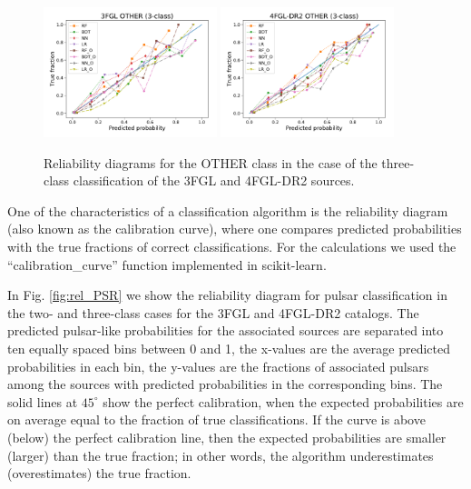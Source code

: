 \documentclass[referee]{aa} %
\begin{document}
\begin{appendix}
\begin{figure}[ht]
\centering
\includegraphics[width=0.45\textwidth]{plots/reliability/calibration_OTHER_3FGL_3classes.pdf}
\includegraphics[width=0.45\textwidth]{plots/reliability/calibration_OTHER_4FGL-DR2_3classes.pdf}
\caption{Reliability diagrams for the OTHER class in the case of the three-class classification of the 3FGL and 4FGL-DR2 sources.
}
\label{fig:rel_OTHER}
\end{figure}

One of the characteristics of a classification algorithm is the reliability diagram (also known as the calibration curve),
where one compares predicted probabilities with the true fractions of correct classifications.
For the calculations we used the ``calibration\_curve'' function implemented in scikit-learn.

In Fig. \ref{fig:rel_PSR} we show the reliability diagram for pulsar classification in the two- and three-class cases
for the 3FGL and 4FGL-DR2 catalogs.
The predicted pulsar-like probabilities for the associated sources are separated into ten equally spaced bins between 0 and 1, 
the x-values are the average predicted probabilities in each bin,
the y-values are the fractions of associated pulsars among the sources with predicted probabilities 
in the corresponding bins.
The solid lines at $45^\circ$ show the perfect calibration, when the expected probabilities are on average equal to the 
fraction of true classifications.
If the curve is above (below) the perfect calibration line, then the expected probabilities are smaller (larger) than the true fraction; in other words, the algorithm underestimates (overestimates) the true fraction.



\end{appendix}
\end{document}
